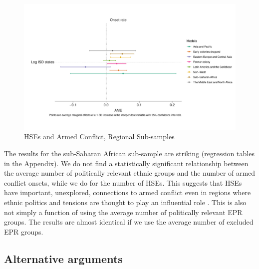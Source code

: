 \begin{figure}[!htb]
	\includegraphics[width=\textwidth]{img/main_regional.pdf}
	\caption{HSEs and Armed Conflict, Regional Sub-samples} 
	\label{Fig: Reg_Margins}
\end{figure}

The results for the sub-Saharan African sub-sample are striking (regression
tables in the Appendix). We do not find a statistically significant relationship
between the average number of politically relevant ethnic groups and the number
of armed conflict onsets, while we do for the number of HSEs. This suggests that
HSEs have important, unexplored, connections to armed conflict even in regions
where ethnic politics and tensions are thought to play an influential role
\citep{Cederman2010}. This is also not simply a function of using the average
number of politically relevant EPR groups. The results are almost identical if
we use the average number of excluded EPR groups. 


\subsection{Alternative arguments}

